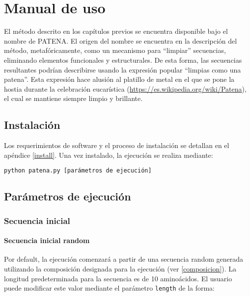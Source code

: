 \chapter{Manual de uso}\label{manual}


El método descrito en los capítulos previos se encuentra disponible bajo el nombre de \mbox{PATENA}. 
El origen del nombre se encuentra en la descripción del método, metafóricamente, como un mecanismo para ``limpiar'' secuencias, eliminando elementos funcionales y estructurales.
De esta forma, las secuencias resultantes podrían describirse usando la expresión popular ``limpias como una patena''.
Esta expresión hace alusión al platillo de metal en el que se pone la hostia durante la celebración eucarística (\url{https://es.wikipedia.org/wiki/Patena}), el cual se mantiene siempre limpio y brillante.



\section{Instalación}


Los requerimientos de software y el proceso de instalación se detallan en el apéndice \ref{install}.
Una vez instalado, la ejecución se realiza mediante: 

\texttt{python patena.py [parámetros de ejecución]}

\section{Parámetros de ejecución}\label{parametros}


\subsection{Secuencia inicial} \label{secuenciaInicial}
\subsubsection{Secuencia inicial random}\label{secuenciaInicialRandom}
Por default, la ejecución comenzará a partir de una secuencia random generada utilizando la composición designada para la ejecución (ver \ref{composicion}).
La longitud predeterminada para la secuencia es de 10 aminoácidos. 
El usuario puede modificar este valor mediante el parámetro \texttt{length} de la forma: 

